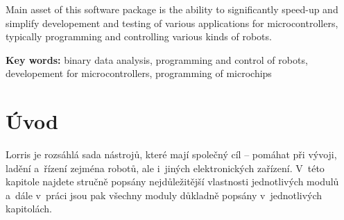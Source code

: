 \documentclass[12pt, a4paper, oneside]{article}
\newcommand{\D}{\medskip \noindent} %
\newcommand{\B}{\textbf} %
\begin{document}
Main asset of this software package is the ability to significantly speed-up and simplify developement and testing of various applications for microcontrollers, typically programming and controlling various kinds of robots.

\D \B{Key words:} binary data analysis, programming and control of robots, developement for microcontrollers, programming of microchips

\addtolength{\textheight}{30mm} %

\newpage
\pagestyle{plain}

\setlength{\voffset}{-20mm} %
\setcounter{page}{1}  %

\tableofcontents  %

\addtolength{\textheight}{-30mm} %
\newpage
\setlength{\voffset}{0mm} %
\pagestyle{plain}

\section*{Úvod}
\label{uvod}
Lorris je rozsáhlá sada nástrojů, které mají společný cíl -- pomáhat při vývoji, ladění a~řízení zejména robotů, ale i~jiných elektronických zařízení. V~této kapitole najdete stručně popsány nejdůležitější vlastnosti jednotlivých modulů a~dále v~práci jsou pak všechny moduly důkladně popsány v~jednotlivých kapitolách.
\end{document}

